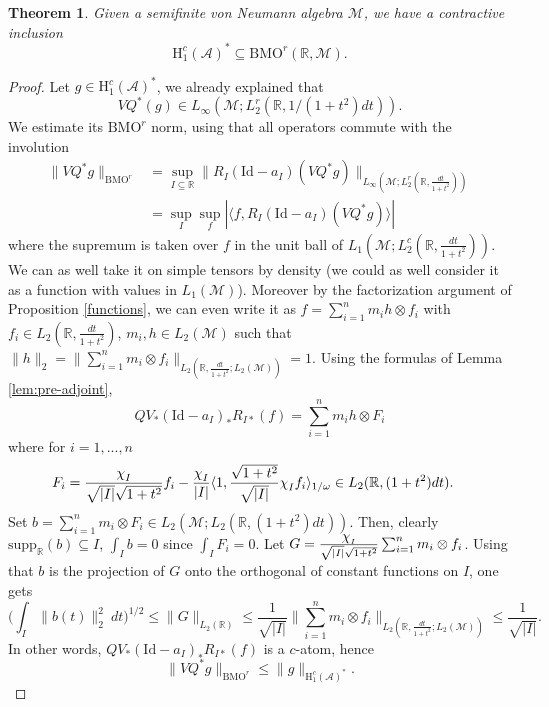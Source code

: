 \documentclass[psamsfonts]{amsart}
\newtheorem{theorem}{Theorem}[section]
\newcommand*{\bigchi}{\mbox{\large$\chi$}}
\newcommand{\Lone}{L_1}
\newcommand{\Linfty}{L_\infty}
\newcommand{\Ltwo}{L_2}
\newcommand{\Ltwoc}{L_2^c}
\newcommand{\Ltwor}{L_2^r}
\newcommand{\Honec}{\mathrm{H}_1^c}
\newcommand{\BMOr}{\mathrm{BMO}^r}
\newcommand{\Hardyc}{\Honec(\mathcal{A})}
\newcommand{\id}{\mathrm{Id}}
\begin{document}
    \begin{theorem}\label{thm:duality1}
        Given a semifinite von Neumann algebra $\mathcal{M}$, we have a contractive inclusion
       $$
            \Hardyc^* \subseteq \BMOr(\mathbb{R},\mathcal{M}).$$
      \end{theorem}
    \begin{proof}
Let $g\in \Hardyc^*$, we already explained that 
$$VQ^*(g)\in  \Linfty(\mathcal M;\Ltwor(\mathbb{R},1/(1+t^2)dt)).$$ We estimate its $\BMOr$ norm, using that all operators commute with the involution
               \begin{align*}
            \|VQ^* g \|_{\BMOr} &= \sup_{I \subseteq \mathbb{R}} \|R_I (\id-a_I)(VQ^* g)\|_{\Linfty(\mathcal{M};\Ltwor(\mathbb{R},\frac{dt}{1+t^2}))} \\
            &= \sup_{I} \sup_{f} |\langle f, R_I(\id-a_I)(VQ^* g) \rangle |
        \end{align*}
        where the supremum is taken over $f$ in the unit ball of $ \Lone(\mathcal{M};\Ltwoc(\mathbb{R},\frac{dt}{1+t^2}))$. 
        We can as well take it on simple tensors by density (we could
        as well consider it as a function with values in
        $\Lone(\mathcal M)$).  Moreover by the factorization argument
        of Proposition \ref{functions}, we can even write it as
        $f=\sum_{i=1}^n m_ih\otimes f_i$ with
        $f_i\in \Ltwo(\mathbb{R},\frac{dt}{1+t^2})$,
        $m_i,h\in \Ltwo(\mathcal M)$ such that
        $\|h\|_2= \|\sum_{i=1}^n m_i\otimes f_i\|_{\Ltwo(\mathbb{R},\frac{dt}{1+t^2};\Ltwo(\mathcal M))}=1$.
        Using the
        formulas of Lemma \ref{lem:pre-adjoint},
        $$QV_*(\id-a_I)_*R_{I*}(f)=\sum_{i=1}^n m_i h\otimes F_i$$ 
        where for $i=1,...,n$
        \begin{align*}
          F_i = \frac{\bigchi_{I}}{\sqrt{|I|}\sqrt{1+t^2}} f_i &- \frac{\bigchi_{I}}{|I|}  \langle 1, \frac{\sqrt{1+t^2}}{\sqrt{|I|}} \bigchi_{I}f_i \rangle_{1/\omega} \in \Ltwo(\mathbb R, (1+t^2)dt).
        \end{align*}
    Set $b=\sum_{i=1}^n m_i\otimes F_i\in \Ltwo(\mathcal M;\Ltwo(\mathbb R, (1+t^2)dt))$. Then, clearly $\mbox{supp}_{\mathbb{R}}(b) \subseteq I$, $\int_{I} b = 0$ since  $\int_{I} F_i = 0$. Let $G=\frac{\bigchi_{I}}{\sqrt{|I|}\sqrt{1+t^2}}\sum_{i=1}^n m_i\otimes f_i$. Using that $b$ is the projection of $G$ onto the orthogonal of constant functions on $I$, one  gets
        $$ \Big( \int_{I} \big\| b(t) \big\|_2^2 \ dt \Big)^{1/2} \leq
        \big\|G\big\|_{L_2(\mathbb R)}\leq \frac{1}{\sqrt{|I|}} \Big\|\sum_{i=1}^n m_i\otimes f_i\Big\|_{\Ltwo(\mathbb{R},\frac{dt}{1+t^2};\Ltwo(\mathcal M))}\leq \frac{1}{ \sqrt{|I|}}.
        $$
        In other words, $QV_*(\id-a_I)_*R_{I*}(f)$ is a $c$-atom, hence
        $$            \|VQ^*g\|_{\BMOr}\leq  \|g\|_{\Hardyc^*}.$$\end{proof}
\end{document}
